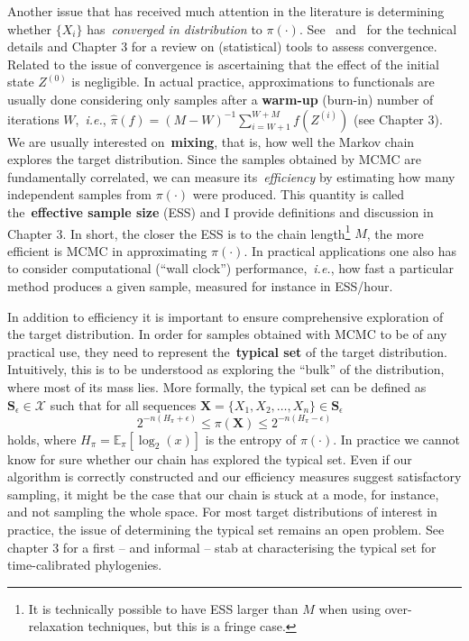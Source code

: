 Another issue that has received much attention in the literature is determining whether $\{X_i\}$ has~\textit{converged in distribution} to $\pi(\cdot)$.
See~\cite{Robert2004} and~\cite{Meyn2012} for the technical details and Chapter 3 for a review on (statistical) tools to assess convergence.
Related to the issue of convergence is ascertaining that the effect of the initial state $Z^{(0)}$ is negligible.
In actual practice, approximations to functionals are usually done considering only samples after a \textbf{warm-up} (burn-in) number of iterations $W$,~\textit{i.e.}, $ \hat{\pi}(f) = (M - W)^{-1}\sum_{i = W + 1}^{W + M} f(Z^{(i)})$ (see Chapter 3).
We are usually interested on~\textbf{mixing}, that is, how well the Markov chain explores the target distribution.
Since the samples obtained by MCMC are fundamentally correlated, we can measure its~\textit{efficiency} by estimating how many independent samples from $\pi(\cdot)$ were produced.
This quantity is called the~\textbf{effective sample size} (ESS) and I provide definitions and discussion in Chapter 3.
In short, the closer the ESS is to the chain length\footnote{It is technically possible to have ESS larger than $M$ when using over-relaxation techniques, but this is a fringe case.} $M$, the more efficient is MCMC in approximating $\pi(\cdot)$.
In practical applications one also has to consider computational (``wall clock'') performance,~\textit{i.e.}, how fast a particular method produces a given sample, measured for instance in ESS/hour.

In addition to efficiency it is important to ensure comprehensive exploration of the target distribution.
In order for samples obtained with MCMC to be of any practical use, they need to represent the~\textbf{typical set} of the target distribution.
Intuitively, this is to be understood as exploring the ``bulk'' of the distribution, where most of its mass lies.
More formally, the typical set can be defined as $\boldsymbol S_\epsilon \in \mathcal{X}$ such that for all sequences $\boldsymbol X = \{X_1, X_2, \ldots, X_n \} \in \boldsymbol S_\epsilon$
\[ 2^{-n\left(H_\pi  + \epsilon\right)} \leq \pi(\boldsymbol X ) \leq 2^{-n\left(H_\pi -\epsilon\right)} \]
holds, where $H_\pi = \mathbb{E}_\pi[\log_2(x)]$ is the entropy of $\pi(\cdot)$. 
In practice we cannot know for sure whether our chain has explored the typical set.
Even if our algorithm is correctly constructed and our efficiency measures suggest satisfactory sampling, it might be the case that our chain is stuck at a mode, for instance, and not sampling the whole space.
For most target distributions of interest in practice, the issue of determining the typical set remains an open problem.
See chapter 3 for a first -- and informal --  stab at characterising the typical set for time-calibrated phylogenies.

